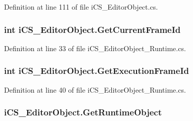 Definition at line 111 of file i\+C\+S\+\_\+\+Editor\+Object.\+cs.

\hypertarget{classi_c_s___editor_object_a90fe7287713ecb4b8b41b805e4ebea81}{
\subsubsection[{Get\+Current\+Frame\+Id}]{\setlength{\rightskip}{0pt plus 5cm}int i\+C\+S\+\_\+\+Editor\+Object.\+Get\+Current\+Frame\+Id\hspace{0.3cm}{\ttfamily [get]}}}\label{classi_c_s___editor_object_a90fe7287713ecb4b8b41b805e4ebea81}


Definition at line 33 of file i\+C\+S\+\_\+\+Editor\+Object\+\_\+\+Runtime.\+cs.

\hypertarget{classi_c_s___editor_object_a62415ea246485f86bf6bea45058d2876}{
\subsubsection[{Get\+Execution\+Frame\+Id}]{\setlength{\rightskip}{0pt plus 5cm}int i\+C\+S\+\_\+\+Editor\+Object.\+Get\+Execution\+Frame\+Id\hspace{0.3cm}{\ttfamily [get]}}}\label{classi_c_s___editor_object_a62415ea246485f86bf6bea45058d2876}


Definition at line 40 of file i\+C\+S\+\_\+\+Editor\+Object\+\_\+\+Runtime.\+cs.

\hypertarget{classi_c_s___editor_object_aaebddd28f6d4b63aecb7631bf2313406}{
\subsubsection[{Get\+Runtime\+Object}]{ i\+C\+S\+\_\+\+Editor\+Object.\+Get\+Runtime\+Object\hspace{0.3cm}{\ttfamily [get]}}}\label{classi_c_s___editor_object_aaebddd28f6d4b63aecb7631bf2313406}


